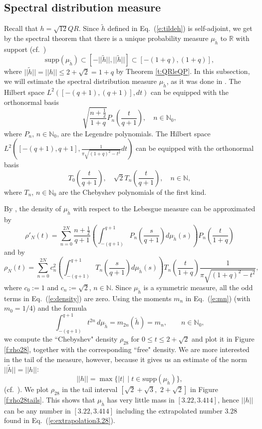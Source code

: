 \documentclass{amsart}
\newcommand{\R}{\mathbb R}
\newcommand{\N}{\mathbb N}
\newcommand{\supp}{\mathrm{supp }}
\theoremstyle{definition}
\begin{document}
 \subsection{Spectral distribution measure}
Recall that $h=\sqrt{12}QR$.
Since $\tilde h$ defined in Eq.~(\ref{e:tildeh}) is self-adjoint, we get by the spectral theorem that
there is a unique probability measure $\mu_{\tilde h}$ to $\R$ with support (cf.~\cite[Section 2]{HaagerupRamirezSolano})
$$\supp(\mu_{\tilde h})\subset [-||\tilde h||,||\tilde h||]\subset [-(1+q),(1+q)],$$
where $||\tilde h||=||h||\le 2+\sqrt{2}=1+q$ by Theorem \ref{t:QRleQP}. 
 In this subsection, we will estimate the spectral distribution measure $\mu_{\tilde h}$, as it was done in \cite[Section 5]{HaagerupRamirezSolano}.
The Hilbert space $L^2([-(q+1),(q+1)],dt)$ can be equipped with the orthonormal basis 
$$\sqrt{\frac{n+\frac12}{1+q}}P_n(\frac{t}{q+1}),\quad n\in \N_0,$$
where $P_n$, $n\in \N_0$, are the Legendre polynomials.
The Hilbert space $L^2([-(q+1),q+1],\frac{1}{\pi\sqrt{(1+q)^2-t^2}}dt)$ can be equipped with the orthonormal basis
$$T_0(\frac{t}{q+1}),\quad \sqrt{2}T_n(\frac{t}{q+1}),\quad n\in\N,$$
where $T_n$, $n\in\N_0$ are the Chebyshev polynomials of the first kind.

By  \cite[Eq. (5.3)]{HaagerupRamirezSolano}, the density of $\mu_{\tilde h}$ with respect to the Lebesgue measure can be approximated by
$$\rho'_N(t)=\sum_{n=0}^{2N} \frac{n+\frac12}{q+1} \left( \int_{-(q+1)}^{q+1} P_n(\frac{s}{q+1})d \mu_{\tilde h}(s)\right)P_n(\frac{t}{1+q})$$
and by
\begin{equation}\label{e:density}
 \rho_N(t)=\sum_{n=0}^{2N} c_n^2\left( \int_{-(q+1)}^{q+1} T_n(\frac{s}{q+1})d \mu_{\tilde h}(s)\right) T_n(\frac{t}{1+q})\frac{1}{\pi\sqrt{(1+q)^2-t^2}},
 \end{equation}
 where $c_0:=1$ and $c_n:=\sqrt{2}$, $n\in\N$.
 Since $\mu_{\tilde h}$ is a symmetric measure, all the odd terms in Eq.~(\ref{e:density}) are zero.
Using the moments $m_n$  in Eq.~(\ref{e:mn}) (with $m_0=1/4$) and the formula 
$$\int_{-(q+1)}^{q+1} t^{2n}\,d\mu_{\tilde h}=m_{2n}(\tilde h)=m_n,\qquad n\in\N_0,$$
we compute the ``Chebyshev" density $\rho_{28}$ for $0\le t\le 2+\sqrt{2}$ and plot it in Figure \ref{f:rho28}, together with the corresponding ``free" density. We are more interested in the tail of the measure, however, because it gives us an estimate of the norm $||\tilde h||=||h||$:
 $$||h||=\max\{|t|\,\mid t\in\supp(\mu_{\tilde h})\},$$
 (cf.~\cite[Section 2]{HaagerupRamirezSolano}).
 We plot $\rho_{28}$ in the tail interval $[\sqrt2+\sqrt3,\,\,2+\sqrt2]$ in Figure \ref{f:rho28tails}.
This shows that $\mu_{\tilde h}$ has very little mass in $[3.22,3.414]$, hence $||h||$ can be any number in $[3.22,3.414]$ including the extrapolated number $3.28$ found in Eq.~(\ref{e:extrapolation3.28}).
\end{document}
